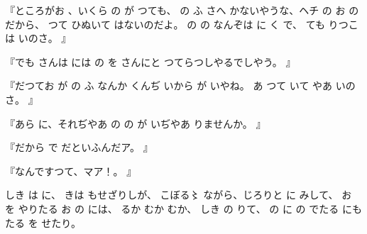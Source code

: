 『ところがお
、いくら
の
が
つても、
の
ふ
さへ
かないやうな、ヘチ
の
お
の
だから、
つて
ひぬいて
はないのだよ。
の
の
なんぞは
に
く
で、
ても
りつこは
いのさ。
』

『でも
さんは
には
の
を
さんにと
つてらつしやるでしやう。
』

『だつてお
が
の
ふ
なんか
くんぢ
いから
が
いやね。
あ
つて
いて
やあ
いのさ。
』

『あら
に、それぢやあ
の
の
が
いぢやあ
りませんか。
』

『だから
で
だといふんだア。
』

『なんですつて、マア！。
』

しき
は
に、%
きは
もせざりしが、
こぼる〻%
ながら、じろりと
に%
みして、
お
を
やりたる
お
の
には、
るか
むか
むか、
しき
の
りて、
の
に
の
でたる
にも
たる
を
せたり。
